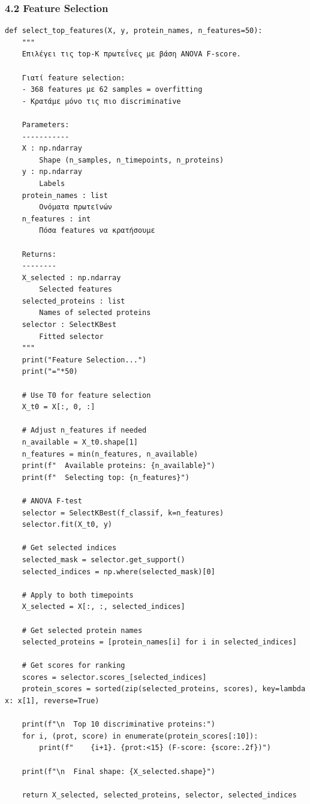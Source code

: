 \subsubsection*{4.2 Feature Selection}
 
\begin{lstlisting}
def select_top_features(X, y, protein_names, n_features=50):
    """
    Επιλέγει τις top-K πρωτεΐνες με βάση ANOVA F-score.
 
    Γιατί feature selection:
    - 368 features με 62 samples = overfitting
    - Κρατάμε μόνο τις πιο discriminative
 
    Parameters:
    -----------
    X : np.ndarray
        Shape (n_samples, n_timepoints, n_proteins)
    y : np.ndarray
        Labels
    protein_names : list
        Ονόματα πρωτεϊνών
    n_features : int
        Πόσα features να κρατήσουμε
 
    Returns:
    --------
    X_selected : np.ndarray
        Selected features
    selected_proteins : list
        Names of selected proteins
    selector : SelectKBest
        Fitted selector
    """
    print("Feature Selection...")
    print("="*50)
 
    # Use T0 for feature selection
    X_t0 = X[:, 0, :]
 
    # Adjust n_features if needed
    n_available = X_t0.shape[1]
    n_features = min(n_features, n_available)
    print(f"  Available proteins: {n_available}")
    print(f"  Selecting top: {n_features}")
 
    # ANOVA F-test
    selector = SelectKBest(f_classif, k=n_features)
    selector.fit(X_t0, y)
 
    # Get selected indices
    selected_mask = selector.get_support()
    selected_indices = np.where(selected_mask)[0]
 
    # Apply to both timepoints
    X_selected = X[:, :, selected_indices]
 
    # Get selected protein names
    selected_proteins = [protein_names[i] for i in selected_indices]
 
    # Get scores for ranking
    scores = selector.scores_[selected_indices]
    protein_scores = sorted(zip(selected_proteins, scores), key=lambda x: x[1], reverse=True)
 
    print(f"\n  Top 10 discriminative proteins:")
    for i, (prot, score) in enumerate(protein_scores[:10]):
        print(f"    {i+1}. {prot:<15} (F-score: {score:.2f})")
 
    print(f"\n  Final shape: {X_selected.shape}")
 
    return X_selected, selected_proteins, selector, selected_indices
\end{lstlisting}
 
